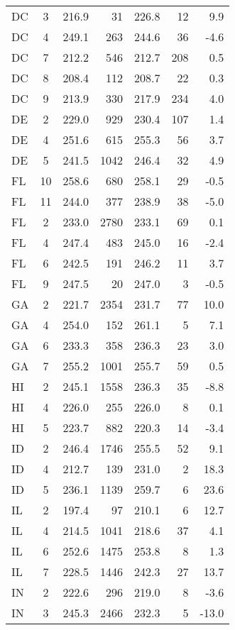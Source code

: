 \begin{longtable}{lcrr@{\extracolsep{10pt}}rr@{\extracolsep{10pt}}r}
  DC & 3 & 216.9 & 31 & 226.8 & 12 & 9.9 \\ 
  DC & 4 & 249.1 & 263 & 244.6 & 36 & -4.6 \\ 
  DC & 7 & 212.2 & 546 & 212.7 & 208 & 0.5 \\ 
  DC & 8 & 208.4 & 112 & 208.7 & 22 & 0.3 \\ 
  DC & 9 & 213.9 & 330 & 217.9 & 234 & 4.0 \\ 
  DE & 2 & 229.0 & 929 & 230.4 & 107 & 1.4 \\ 
  DE & 4 & 251.6 & 615 & 255.3 & 56 & 3.7 \\ 
  DE & 5 & 241.5 & 1042 & 246.4 & 32 & 4.9 \\ 
  FL & 10 & 258.6 & 680 & 258.1 & 29 & -0.5 \\ 
  FL & 11 & 244.0 & 377 & 238.9 & 38 & -5.0 \\ 
  FL & 2 & 233.0 & 2780 & 233.1 & 69 & 0.1 \\ 
  FL & 4 & 247.4 & 483 & 245.0 & 16 & -2.4 \\ 
  FL & 6 & 242.5 & 191 & 246.2 & 11 & 3.7 \\ 
  FL & 9 & 247.5 & 20 & 247.0 &  3 & -0.5 \\ 
  GA & 2 & 221.7 & 2354 & 231.7 & 77 & 10.0 \\ 
  GA & 4 & 254.0 & 152 & 261.1 &  5 & 7.1 \\ 
  GA & 6 & 233.3 & 358 & 236.3 & 23 & 3.0 \\ 
  GA & 7 & 255.2 & 1001 & 255.7 & 59 & 0.5 \\ 
  HI & 2 & 245.1 & 1558 & 236.3 & 35 & -8.8 \\ 
  HI & 4 & 226.0 & 255 & 226.0 &  8 & 0.1 \\ 
  HI & 5 & 223.7 & 882 & 220.3 & 14 & -3.4 \\ 
  ID & 2 & 246.4 & 1746 & 255.5 & 52 & 9.1 \\ 
  ID & 4 & 212.7 & 139 & 231.0 &  2 & 18.3 \\ 
  ID & 5 & 236.1 & 1139 & 259.7 &  6 & 23.6 \\ 
  IL & 2 & 197.4 & 97 & 210.1 &  6 & 12.7 \\ 
  IL & 4 & 214.5 & 1041 & 218.6 & 37 & 4.1 \\ 
  IL & 6 & 252.6 & 1475 & 253.8 &  8 & 1.3 \\ 
  IL & 7 & 228.5 & 1446 & 242.3 & 27 & 13.7 \\ 
  IN & 2 & 222.6 & 296 & 219.0 &  8 & -3.6 \\ 
  IN & 3 & 245.3 & 2466 & 232.3 &  5 & -13.0 \\ 

\end{longtable}
